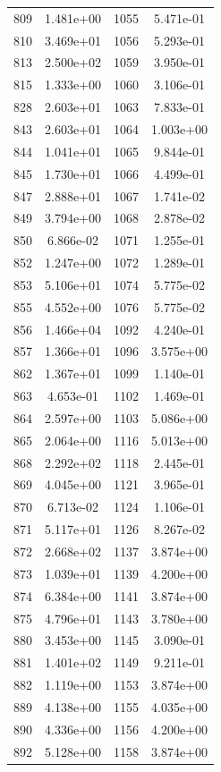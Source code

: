 \documentclass[12pt]{article}
\begin{document}
\begin{longtable}{@{}cccc@{}}
809 & 1.481e+00 & 1055 & 5.471e-01 \\
810 & 3.469e+01 & 1056 & 5.293e-01 \\
813 & 2.500e+02 & 1059 & 3.950e-01 \\
815 & 1.333e+00 & 1060 & 3.106e-01 \\
828 & 2.603e+01 & 1063 & 7.833e-01 \\
843 & 2.603e+01 & 1064 & 1.003e+00 \\
844 & 1.041e+01 & 1065 & 9.844e-01 \\
845 & 1.730e+01 & 1066 & 4.499e-01 \\
847 & 2.888e+01 & 1067 & 1.741e-02 \\
849 & 3.794e+00 & 1068 & 2.878e-02 \\
850 & 6.866e-02 & 1071 & 1.255e-01 \\
852 & 1.247e+00 & 1072 & 1.289e-01 \\
853 & 5.106e+01 & 1074 & 5.775e-02 \\
855 & 4.552e+00 & 1076 & 5.775e-02 \\
856 & 1.466e+04 & 1092 & 4.240e-01 \\
857 & 1.366e+01 & 1096 & 3.575e+00 \\
862 & 1.367e+01 & 1099 & 1.140e-01 \\
863 & 4.653e-01 & 1102 & 1.469e-01 \\
864 & 2.597e+00 & 1103 & 5.086e+00 \\
865 & 2.064e+00 & 1116 & 5.013e+00 \\
868 & 2.292e+02 & 1118 & 2.445e-01 \\
869 & 4.045e+00 & 1121 & 3.965e-01 \\
870 & 6.713e-02 & 1124 & 1.106e-01 \\
871 & 5.117e+01 & 1126 & 8.267e-02 \\
872 & 2.668e+02 & 1137 & 3.874e+00 \\
873 & 1.039e+01 & 1139 & 4.200e+00 \\
874 & 6.384e+00 & 1141 & 3.874e+00 \\
875 & 4.796e+01 & 1143 & 3.780e+00 \\
880 & 3.453e+00 & 1145 & 3.090e-01 \\
881 & 1.401e+02 & 1149 & 9.211e-01 \\
882 & 1.119e+00 & 1153 & 3.874e+00 \\
889 & 4.138e+00 & 1155 & 4.035e+00 \\
890 & 4.336e+00 & 1156 & 4.200e+00 \\
892 & 5.128e+00 & 1158 & 3.874e+00 \\

\end{longtable}
\end{document}
